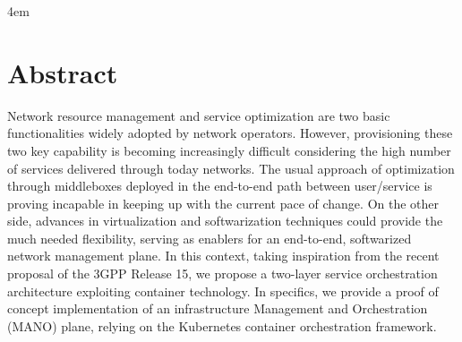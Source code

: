 \cleardoublepage
{}

\thispagestyle{empty}

\vspace*{\fill}
\par
\begingroup
\leftskip4em
\rightskip\leftskip
\section*{\centering Abstract}
Network resource management and service optimization are two basic
functionalities widely adopted by network operators. However, provisioning these
two key capability is becoming increasingly difficult considering the high
number of services delivered through today networks. The usual approach of
optimization through middleboxes deployed in the end-to-end path between
user/service is proving incapable in keeping up with the current pace of change.
On the other side, advances in virtualization and softwarization techniques
could provide the much needed flexibility, serving as enablers for an
end-to-end, softwarized network management plane. In this context, taking
inspiration from the recent proposal of the 3GPP Release 15, we propose a
two-layer service orchestration architecture exploiting container technology. In
specifics, we provide a proof of concept implementation of an infrastructure
Management and Orchestration (MANO) plane, relying on the Kubernetes container
orchestration framework.
\par
\endgroup
\vspace*{\fill}
